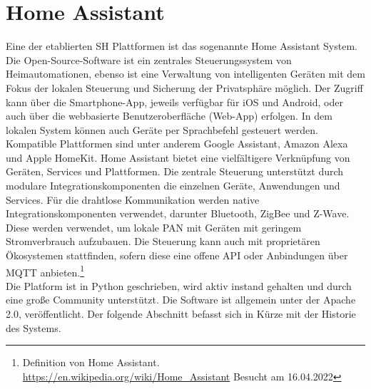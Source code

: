 \section{Home Assistant}
\label{sec:homeassistant}
    Eine der etablierten \acl{SH} Plattformen ist das sogenannte Home Assistant System. Die Open-Source-Software ist ein zentrales 
    Steuerungssystem von Heimautomationen, ebenso ist eine Verwaltung von intelligenten Geräten mit dem Fokus der lokalen Steuerung und Sicherung der 
    Privatsphäre möglich. Der Zugriff kann über die Smartphone-App, jeweils verfügbar für iOS und Android, oder auch über die webbasierte 
    Benutzeroberfläche (Web-App) erfolgen. In dem lokalen System können auch Geräte per Sprachbefehl gesteuert werden. Kompatible 
    Plattformen sind unter anderem Google Assistant, Amazon Alexa und Apple HomeKit. %
    Home Assistant bietet eine vielfältigere Verknüpfung von Geräten, Services und Plattformen. Die zentrale Steuerung 
    unterstützt durch modulare Integrationskomponenten die einzelnen Geräte, Anwendungen und Services. Für die drahtlose Kommunikation 
    werden native Integrationskomponenten verwendet, darunter Bluetooth, ZigBee und Z-Wave. Diese werden verwendet, um lokale \ac{PAN} mit 
    Geräten mit geringem Stromverbrauch aufzubauen. Die Steuerung kann auch mit proprietären Ökosystemen stattfinden, sofern diese eine offene 
    \acs{API} oder Anbindungen über \acs{MQTT} anbieten.\footnote{Definition von Home Assistant. \url{https://en.wikipedia.org/wiki/Home_Assistant} Besucht am 16.04.2022}
    \\
    Die Platform ist in Python geschrieben, wird aktiv instand gehalten und durch eine große Community unterstützt. Die Software ist allgemein unter 
    der Apache 2.0, veröffentlicht. Der folgende Abschnitt befasst sich in Kürze mit der Historie des Systems. 
    
